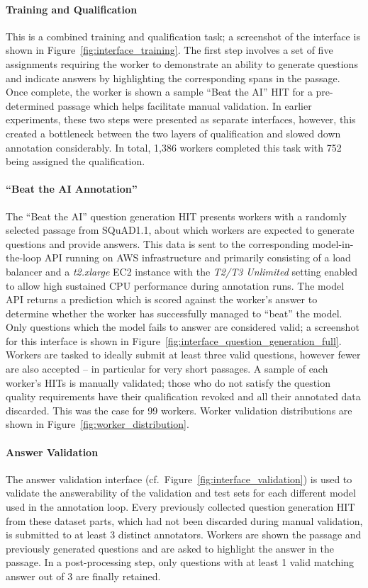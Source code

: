 \documentclass[11pt,a4paper]{article}
\newcommand{\squadone}{SQuAD1.1}
\begin{document}
    \paragraph{Training and Qualification}{
    This is a combined training and qualification task; a screenshot of the interface is shown in Figure~\ref{fig:interface_training}.
The first step involves a set of five assignments requiring the worker to demonstrate an ability to generate questions and indicate answers by highlighting the corresponding spans in the passage. 
Once complete, the worker is shown a sample ``Beat the AI'' HIT for a pre-determined passage which helps facilitate manual validation. 
In earlier experiments, these two steps were presented as separate interfaces, however, this created a bottleneck between the two layers of qualification and slowed down annotation considerably. 
In total, 1,386 workers completed this task with 752 being assigned the qualification.
    }
    
    
    \paragraph{``Beat the AI Annotation''}{
    The ``Beat the AI'' question generation HIT presents workers with a randomly selected passage from \squadone{}, about which workers are expected to generate questions and provide answers. 
This data is sent to the corresponding model-in-the-loop API running on AWS infrastructure and primarily consisting of a load balancer and a \textit{t2.xlarge} EC2 instance with the \textit{T2/T3 Unlimited} setting enabled to allow high sustained CPU performance during annotation runs. 
The model API returns a prediction which is scored against the worker's answer to determine whether the worker has successfully managed to ``beat'' the model.
Only questions which the model fails to answer are considered valid; a screenshot for this interface is shown in Figure~\ref{fig:interface_question_generation_full}.
Workers are tasked to ideally submit at least three valid questions, however fewer are also accepted -- in particular for very short passages. 
A sample of each worker's HITs is manually validated; 
those who do not satisfy the question quality requirements have their qualification revoked and all their annotated data discarded. 
This was the case for 99 workers. 
Worker validation distributions are shown in Figure~\ref{fig:worker_distribution}.
    }
    
    
    \paragraph{Answer Validation}{
    The answer validation interface (cf.~Figure~\ref{fig:interface_validation}) is used to validate the answerability of the validation and test sets for each different model used in the annotation loop. 
Every previously collected question generation HIT from these dataset parts, which had not been discarded during manual validation, is submitted to at least 3 distinct annotators. 
Workers are shown the passage and previously generated questions and are asked to highlight the answer in the passage. 
In a post-processing step, only questions with at least 1 valid matching answer out of 3 are finally retained.
    }
    
\end{document}
